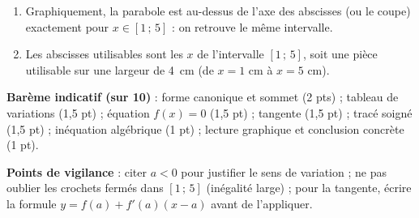 \documentclass[11pt]{article}
\begin{document}
\begin{corrige}
\begin{enumerate}
\item Graphiquement, la parabole est au-dessus de l'axe des abscisses (ou le coupe) exactement pour $x\in[1\,;\,5]$ : on retrouve le même intervalle.
\item Les abscisses utilisables sont les $x$ de l'intervalle $[1\,;\,5]$, soit une pièce utilisable sur une largeur de \SI{4}{cm} (de $x=1$ cm à $x=5$ cm).
\end{enumerate}
\textbf{Barème indicatif (sur 10)} : forme canonique et sommet (2 pts) ; tableau de variations (1,5 pt) ; équation $f(x)=0$ (1,5 pt) ; tangente (1,5 pt) ; tracé soigné (1,5 pt) ; inéquation algébrique (1 pt) ; lecture graphique et conclusion concrète (1 pt).\par
\textbf{Points de vigilance} : citer $a<0$ pour justifier le sens de variation ; ne pas oublier les crochets fermés dans $[1\,;\,5]$ (inégalité large) ; pour la tangente, écrire la formule $y=f(a)+f'(a)(x-a)$ avant de l'appliquer.
\end{corrige}
\end{document}
